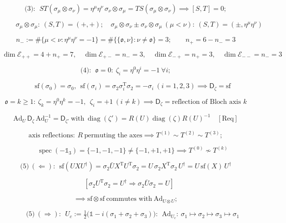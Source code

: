 \begin{theorem}
\[
\text{(3)}:\ \ ST(\sigma_\mu\otimes\sigma_\nu)=\eta^\mu\eta^\nu\,\sigma_\nu\otimes\sigma_\mu=TS(\sigma_\mu\otimes\sigma_\nu)\implies[S,T]=0;
\]

\[
\qquad \sigma_\mu\otimes\sigma_\mu:\ (S,T)=(+,+);\quad
\sigma_\mu\otimes\sigma_\nu\pm\sigma_\nu\otimes\sigma_\mu\ (\mu<\nu):\ (S,T)=(\pm,\eta^\mu\eta^\nu)
\]

\[
n_-:=\#\{\mu<\nu:\eta^\mu\eta^\nu=-1\}=\#\bigl\{\{\mathfrak o,\nu\}:\nu\ne\mathfrak o\bigr\}=3;\qquad n_+=6-n_-=3
\]

\[
\dim\mathcal E_{++}=4+n_+=7,\quad\dim\mathcal E_{+-}=n_-=3,\quad\dim\mathcal E_{-+}=n_+=3,\quad\dim\mathcal E_{--}=n_-=3
\]

\[
\text{(4)}:\ \ \mathfrak o=0:\ \zeta_i=\eta^0\eta^i=-1\ \forall i;
\]

\[
\qquad \mathrm{sf}(\sigma_0)=\sigma_0,\ \ \mathrm{sf}(\sigma_i)=\sigma_2\sigma_i^{\mathrm T}\sigma_2=-\sigma_i\ (i=1,2,3)\implies\mathsf D_\zeta=\mathrm{sf}
\]

\[
\mathfrak o=k\ge1:\ \zeta_k=\eta^0\eta^k=-1,\ \ \zeta_i=+1\ (i\ne k)\implies\mathsf D_\zeta=\text{reflection of Bloch axis }k
\]

\[
\mathrm{Ad}_U\,\mathsf D_\zeta\,\mathrm{Ad}_U^{-1}=\mathsf D_{\zeta'}\ \text{with}\ \operatorname{diag}(\zeta')=R(U)\operatorname{diag}(\zeta)R(U)^{-1}\quad[\text{Req}]
\]

\[
\text{axis reflections}:\ R\ \text{permuting the axes}\implies T^{(1)}\sim T^{(2)}\sim T^{(3)};
\]

\[
\qquad \operatorname{spec}(-\mathbb1_3)=\{-1,-1,-1\}\ne\{-1,+1,+1\}\implies T^{(0)}\not\sim T^{(k)}
\]

\[
\text{(5)}\ (\Leftarrow):\ \ \mathrm{sf}(UXU^\dagger)=\sigma_2\bar UX^{\mathrm T}U^{\mathrm T}\sigma_2=U\,\sigma_2X^{\mathrm T}\sigma_2\,U^\dagger=U\,\mathrm{sf}(X)\,U^\dagger
\]

\[
\quad [\sigma_2U^{\mathrm T}\sigma_2=U^\dagger\Rightarrow\sigma_2\bar U\sigma_2=U]
\]

\[
\implies\mathrm{sf}\otimes\mathrm{sf}\ \text{commutes with}\ \mathrm{Ad}_{U\otimes U};
\]

\[
\qquad \text{(5)}\ (\Rightarrow):\ \ U_c:=\tfrac12\bigl(\mathbb1-i(\sigma_1+\sigma_2+\sigma_3)\bigr):\ \ \mathrm{Ad}_{U_c}:\ \sigma_1\mapsto\sigma_2\mapsto\sigma_3\mapsto\sigma_1
\]


\end{theorem}
